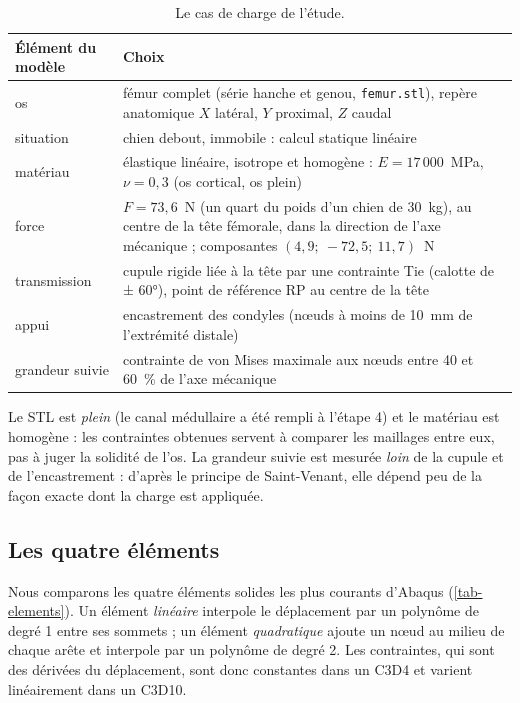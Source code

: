 \documentclass[11pt,a4paper]{article}
\newcommand{\fichier}[1]{\texttt{\small #1}}
\begin{document}
\begin{table}[h]
\centering\small
\caption{Le cas de charge de l'étude.}
\label{tab-cas}
\begin{tabularx}{\textwidth}{lY}
\toprule
\textbf{Élément du modèle} & \textbf{Choix} \\
\midrule
os & fémur complet (série hanche et genou, \fichier{femur.stl}), repère anatomique $X$ latéral, $Y$ proximal,
$Z$ caudal \\
situation & chien debout, immobile : calcul statique linéaire \\
matériau & élastique linéaire, isotrope et homogène : $E = 17\,000$~MPa, $\nu = 0{,}3$ (os cortical, os plein) \\
force & $F = 73{,}6$~N (un quart du poids d'un chien de 30~kg), au centre de la tête fémorale, dans la direction de
l'axe mécanique ; composantes $(4{,}9 ;\ -72{,}5 ;\ 11{,}7)$~N \\
transmission & cupule rigide liée à la tête par une contrainte Tie (calotte de ± 60°), point de référence RP au
centre de la tête \\
appui & encastrement des condyles (nœuds à moins de 10~mm de l'extrémité distale) \\
grandeur suivie & contrainte de von Mises maximale aux nœuds entre 40 et 60~\% de l'axe mécanique \\
\bottomrule
\end{tabularx}
\end{table}

Le STL est \emph{plein} (le canal médullaire a été rempli à l'étape 4) et le matériau est homogène : les contraintes
obtenues servent à comparer les maillages entre eux, pas à juger la solidité de l'os. La grandeur suivie est mesurée
\emph{loin} de la cupule et de l'encastrement : d'après le principe de Saint-Venant, elle dépend peu de la façon exacte
dont la charge est appliquée.

\subsection{Les quatre éléments}

Nous comparons les quatre éléments solides les plus courants d'Abaqus (\cref{tab-elements}). Un élément
\emph{linéaire} interpole le déplacement par un polynôme de degré 1 entre ses sommets ; un élément \emph{quadratique}
ajoute un nœud au milieu de chaque arête et interpole par un polynôme de degré 2. Les contraintes, qui sont des
dérivées du déplacement, sont donc constantes dans un C3D4 et varient linéairement dans un C3D10.
\end{document}
